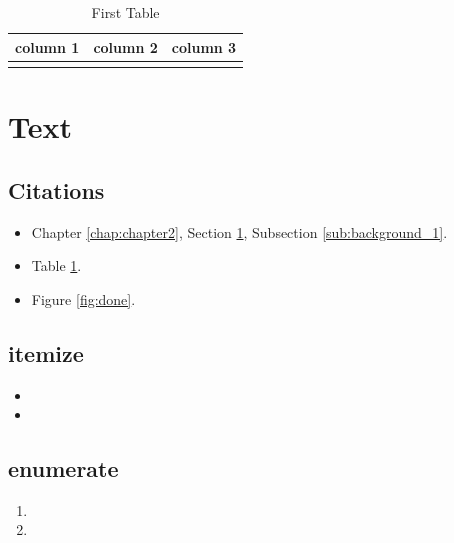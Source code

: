 \documentclass[letterpaper, 12pt, oneside]{book}
\theoremstyle{plain}
\theoremstyle{definition}
\theoremstyle{remark}
\begin{document}
\begin{table}[tb]
  \caption{First Table}
  \label{tab:tablename}
  \centering

  \begin{tabular}{l|cc}
  \hline

  \hline
  \textbf{column 1} & \textbf{column 2} & \textbf{column 3} \\
  \hline
     & & \\
  \hline

  \hline
  \end{tabular}
\end{table}

\lipsum[1]

\section{Text} %
\label{sec:text}

\subsection{Citations} %
\label{sub:citations}
\begin{itemize}
\item Chapter \ref{chap:chapter2}, Section \ref{sec:text}, Subsection \ref{sub:background_1}.
\item Table \ref{tab:tablename}.
\item Figure \ref{fig:done}.
\end{itemize}

\subsection{itemize} %
\label{sub:itemize}

\begin{itemize}
\item \lipsum[1]
\item \lipsum[1]
\end{itemize}

\subsection{enumerate} %
\label{sub:enumerate}

\begin{enumerate}
\item \lipsum[1]
\item \lipsum[1]
\end{enumerate}


\renewcommand\bibname{References}


% 
% 
\end{document}
